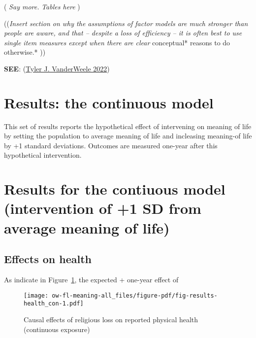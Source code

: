 \documentclass[
  singlecolumn]{report}
\begin{document}
( \emph{Say more.} \emph{Tables here} )

((\emph{Insert section on why the assumptions of factor models are much
stronger than people are aware, and that -- despite a loss of efficiency
-- it is often best to use single item measures except when there are
clear} conceptual* reasons to do otherwise.* ))

\textbf{SEE}: (\protect\hyperlink{ref-vanderweele2022}{Tyler J.
VanderWeele 2022})

\hypertarget{results-the-continuous-model}{%
\section{Results: the continuous
model}\label{results-the-continuous-model}}

This set of results reports the hypothetical effect of intervening on
meaning of life by setting the population to average meaning of life and
incleasing meaning-of life by +1 standard deviations. Outcomes are
measured one-year after this hypothetical intervention.

\hypertarget{results-for-the-contiuous-model-intervention-of-1-sd-from-average-meaning-of-life}{%
\section{Results for the contiuous model (intervention of +1 SD from
average meaning of
life)}\label{results-for-the-contiuous-model-intervention-of-1-sd-from-average-meaning-of-life}}

\hypertarget{effects-on-health}{%
\subsection{Effects on health}\label{effects-on-health}}

As indicate in Figure~\ref{fig-results-health_con}, the expected +
one-year effect of

\begin{figure}

{\centering \texttt{[image: ow-fl-meaning-all\_files/figure-pdf/fig-results-health\_con-1.pdf]}

}

\caption{\label{fig-results-health_con}Causal effects of religious loss
on reported physical health (continuous exposure)}

\end{figure}
\end{document}
